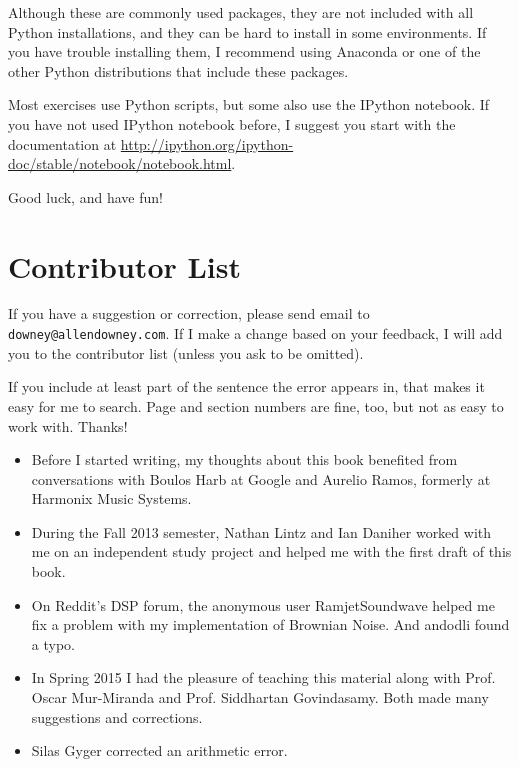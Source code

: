 \documentclass[12pt]{book}
\begin{document}
Although these are commonly used packages, they are not included with
all Python installations, and they can be hard to install in some
environments.  If you have trouble installing them, I
recommend using Anaconda or one of the other Python distributions
that include these packages.

Most exercises use Python scripts, but some also use the IPython
notebook.  If you have not used IPython notebook before, I suggest
you start with the documentation at
\url{http://ipython.org/ipython-doc/stable/notebook/notebook.html}.

Good luck, and have fun!



\section*{Contributor List}

If you have a suggestion or correction, please send email to 
{\tt downey@allendowney.com}.  If I make a change based on your
feedback, I will add you to the contributor list
(unless you ask to be omitted).

If you include at least part of the sentence the
error appears in, that makes it easy for me to search.  Page and
section numbers are fine, too, but not as easy to work with.
Thanks!

\small

\begin{itemize}

\item Before I started writing, my thoughts about this book
benefited from conversations with Boulos Harb at Google and
Aurelio Ramos, formerly at Harmonix Music Systems.

\item During the Fall 2013 semester, Nathan Lintz and Ian Daniher
worked with me on an independent study project and helped me with
the first draft of this book.

\item On Reddit's DSP forum, the anonymous user RamjetSoundwave
helped me fix a problem with my implementation of Brownian Noise.
And andodli found a typo.

\item In Spring 2015 I had the pleasure of teaching this material
along with Prof. Oscar Mur-Miranda and Prof. Siddhartan Govindasamy.
Both made many suggestions and corrections.

\item Silas Gyger corrected an arithmetic error.


\end{itemize}
\end{document}
